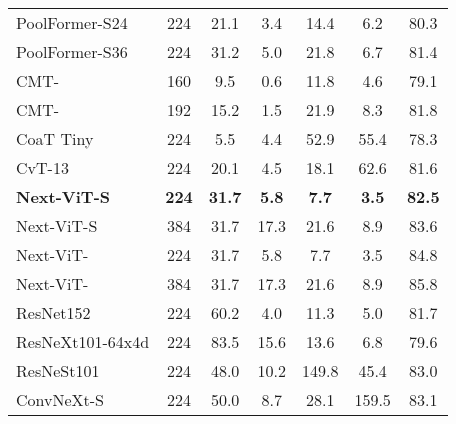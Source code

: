 \documentclass[10pt,twocolumn,letterpaper]{article}
\begin{document}
\begin{table}[]
{\begin{tabular}{l|c|cc|cc|c}
    PoolFormer-S24\cite{metaformer}   &224   & 21.1      & 3.4       & 14.4     & 6.2      & 80.3        \\
    PoolFormer-S36\cite{metaformer}   &224   & 31.2      & 5.0       & 21.8     & 6.7     & 81.4        \\
    CMT-\cite{Cmt}  &160 & 9.5      &0.6        & 11.8     & 4.6          & 79.1        \\ 
    CMT-\cite{Cmt} &192  & 15.2      & 1.5       & 21.9     & 8.3          & 81.8        \\
    CoaT Tiny\cite{CoaT}  &224 & 5.5      & 4.4       & 52.9     & 55.4          & 78.3        \\
    CvT-13\cite{CvT}    &224     & 20.1      & 4.5       & 18.1     & 62.6          & 81.6        \\
\textbf{Next-ViT-S} &\textbf{224}    &\textbf{31.7}      &\textbf{5.8}       &\textbf{7.7}   &  \textbf{3.5}        & \textbf{82.5}        \\
    Next-ViT-S &384  & 31.7      & 17.3       & 21.6   &   8.9        & 83.6        \\
    Next-ViT- &224  & 31.7      & 5.8       & 7.7   &   3.5        & 84.8        \\
    Next-ViT- &384  & 31.7      & 17.3       & 21.6   &   8.9        & 85.8        \\
    \midrule
    ResNet152\cite{ResNet}       &224          & 60.2      & 4.0      & 11.3      & 5.0   & 81.7          \\
    ResNeXt101-64x4d\cite{ResNeXt}   & 224    & 83.5 &15.6     & 13.6      & 6.8   & 79.6          \\
    ResNeSt101\cite{zhang2022resnest}       &224      & 48.0      & 10.2      & 149.8      & 45.4   & 83.0          \\
    ConvNeXt-S\cite{ConvNext}      &224    & 50.0      & 8.7       & 28.1      &159.5    & 83.1          \\
    

\end{tabular}}
\end{table}
\end{document}
